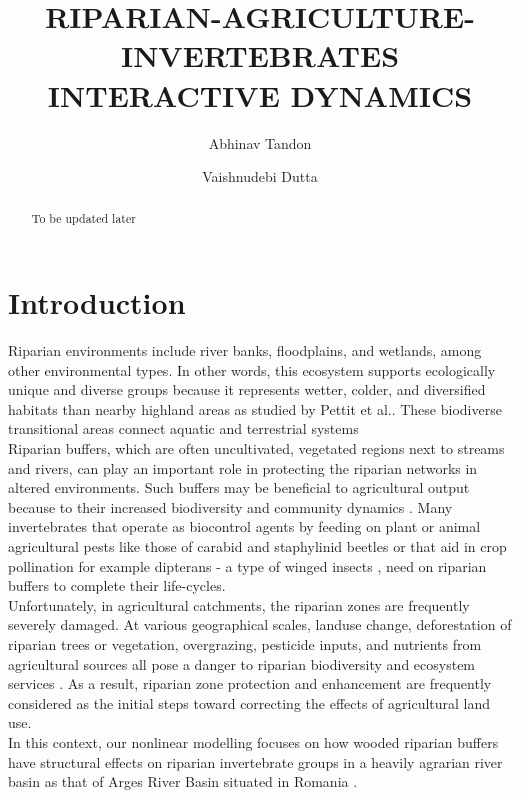 \documentclass[12pt]{article}
\date{}
\author[1]{Abhinav Tandon}
\author[2]{Vaishnudebi Dutta}
\affil[1]{Corresponding Author\thanks{abhinav.abhi02@gmail.com}}
\affil[1,2]{Birla Institute of Technology Mesra, Ranchi - 835215, Jharkhand, INDIA}
\title{RIPARIAN-AGRICULTURE-INVERTEBRATES INTERACTIVE DYNAMICS}
\date{}
\numberwithin{equation}{section}
\begin{document}
\maketitle
\vspace{-1cm}
\begin{abstract}
To be updated later
\end{abstract}
\section{Introduction}
Riparian environments include river banks, floodplains, and wetlands, among other environmental types. In other words, this ecosystem supports ecologically unique and diverse groups because it represents wetter, colder, and diversified habitats than nearby highland areas as studied by Pettit et al.\cite{pettit2007fire}. These biodiverse transitional areas connect aquatic and terrestrial systems \cite{popescu2021riparian} \\ 
Riparian buffers, which are often uncultivated, vegetated regions next to streams and rivers, can play an important role in protecting the riparian networks in altered environments\cite{burdon2020assessing}. Such buffers may be beneficial to agricultural output because to their increased biodiversity and community dynamics \cite{forio2020small}. Many invertebrates that operate as biocontrol agents by feeding on plant or animal agricultural pests like those of carabid and staphylinid beetles \cite{andersen2000long} or that aid in crop pollination for example dipterans - a type of winged insects \cite{ssymank2008pollinating}, need on riparian buffers to complete their life-cycles.\\
Unfortunately, in agricultural catchments, the riparian zones are frequently severely damaged. At various geographical scales, landuse change, deforestation of riparian trees or vegetation, overgrazing, pesticide inputs, and nutrients from agricultural sources all pose a danger to riparian biodiversity and ecosystem services \cite{burdon2013habitat}. As a result, riparian zone protection and enhancement are frequently considered as the initial steps toward correcting the effects of agricultural land use.\\
In this context, our nonlinear modelling focuses on how wooded riparian buffers have structural effects on riparian invertebrate groups in a heavily agrarian river basin as that of Arges River Basin situated in Romania \cite{popescu2021riparian}.\\
\vspace{-1cm}
\end{document}
